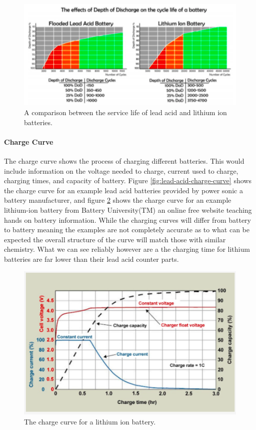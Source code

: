 \begin{figure}
    \centering
    \includegraphics[scale=0.5]{figures/service life.png}
    \caption{A comparison between the service life of lead acid and lithium ion batteries.}
    \label{fig:service-life} 
\end{figure}

\paragraph{Charge Curve}
The charge curve shows the process of charging different batteries. This would include information on the voltage needed to charge, current used to charge, charging times, and capacity of battery. Figure \ref{fig:lead-acid-charge-curve} shows the charge curve for an example lead acid batteries provided by power sonic a battery manufacturer, and figure \ref{fig:lithium-charge-curve} shows the charge curve for an example lithium-ion battery from Battery University(TM) an online free website teaching hands on battery information. While the charging curves will differ from battery to battery meaning the examples are not completely accurate as to what can be expected the overall structure of the curve will match those with similar chemistry. What we can see reliably however are a the charging time for lithium batteries are far lower than their lead acid counter parts.

\begin{figure}
    \centering
    \includegraphics[scale=0.5]{figures/lithium charge curve.png}
    \caption{The charge curve for a lithium ion battery.}
    \label{fig:lithium-charge-curve} 
\end{figure}

